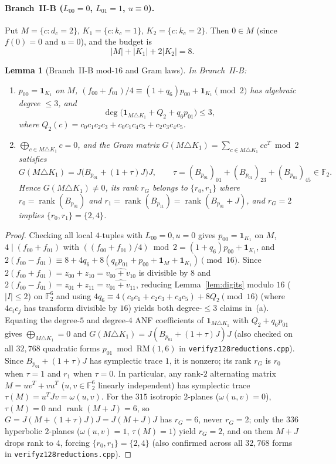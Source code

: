 \documentclass[11pt]{article}
\newtheorem{lemma}[theorem]{Lemma}
\theoremstyle{definition}
\theoremstyle{remark}
\newcommand{\F}{\mathbb{F}}
\newcommand{\rank}{\operatorname{rank}}
\newcommand{\ind}{\mathbf{1}}
\newcommand{\RM}{\mathrm{RM}}
\newcommand{\code}[1]{\texttt{#1}}
\DeclareRobustCommand{\_}{\textunderscore\allowbreak}
\begin{document}
\paragraph{Branch~II-B ($L_{00}=0$, $L_{01}=1$, $u\equiv0$).}
Put $M=\{c:d_c=2\}$, $K_1=\{c:k_c=1\}$, $K_2=\{c:k_c=2\}$. Then $0\in M$ (since $f(0)=0$ and $u=0$), and the budget is
\[
  |M|+|K_1|+2|K_2|=8.
\]

\begin{lemma}[Branch~II-B mod-$16$ and Gram laws]\label{lem:IIB-mod16}
In Branch~II-B:
\begin{enumerate}[label=(\alph*),nosep]
\item $p_{00}=\ind_{K_1}$ on $M$, $(f_{00}+f_{01})/4\equiv(1+q_6)p_{00}+\ind_{K_1}\pmod2$ has algebraic degree $\le3$, and
\[
  \deg\big(\ind_{M\triangle K_1}+Q_2+q_6p_{01}\big)\le3,
\]
where $Q_2(c)=c_0c_1c_2c_3+c_0c_1c_4c_5+c_2c_3c_4c_5$.
\item $\bigoplus_{c\in M\triangle K_1}c=0$, and the Gram matrix $G(M\triangle K_1)=\sum_{c\in M\triangle K_1}cc^T\bmod2$ satisfies
\[
  G(M\triangle K_1)=J\big(B_{p_{01}}+(1+\tau)J\big)J,\qquad
  \tau=(B_{p_{01}})_{01}+(B_{p_{01}})_{23}+(B_{p_{01}})_{45}\in\F_2.
\]
Hence $G(M\triangle K_1)\neq0$, its rank $r_G$ belongs to $\{r_0,r_1\}$ where $r_0=\rank(B_{p_{01}})$ and $r_1=\rank(B_{p_{11}})=\rank(B_{p_{01}}+J)$, and $r_G=2$ implies $\{r_0,r_1\}=\{2,4\}$.
\end{enumerate}
\end{lemma}

\begin{proof}
Checking all local $4$-tuples with $L_{00}=0, u=0$ gives $p_{00}=\ind_{K_1}$ on $M$, $4\mid(f_{00}+f_{01})$ with $((f_{00}+f_{01})/4)\bmod2=(1+q_6)p_{00}+\ind_{K_1}$, and $2(f_{00}-f_{01})\equiv8+4q_6+8(q_6p_{01}+p_{00}+\ind_M+\ind_{K_1})\pmod{16}$. Since $2(f_{00}+f_{01})=z_{00}+z_{10}=\widehat{v_{00}+v_{10}}$ is divisible by $8$ and $2(f_{00}-f_{01})=z_{01}+z_{11}=\widehat{v_{01}+v_{11}}$, reducing Lemma~\ref{lem:digits} modulo $16$ ($|I|\le2$) on $\F_2^6$ and using $4q_6\equiv4(c_0c_1+c_2c_3+c_4c_5)+8Q_2\pmod{16}$ (where $4c_ic_j$ has transform divisible by $16$) yields both degree-$\le3$ claims in~(a). Equating the degree-$5$ and degree-$4$ ANF coefficients of $\ind_{M\triangle K_1}$ with $Q_2+q_6p_{01}$ gives $\bigoplus_{M\triangle K_1}=0$ and $G(M\triangle K_1)=J(B_{p_{01}}+(1+\tau)J)J$ (also checked on all $32{,}768$ quadratic forms $p_{01}\bmod\RM(1,6)$ in \code{verify\_z128\_reductions.cpp}). Since $B_{p_{01}}+(1+\tau)J$ has symplectic trace $1$, it is nonzero; its rank $r_G$ is $r_0$ when $\tau=1$ and $r_1$ when $\tau=0$. In particular, any rank-$2$ alternating matrix $M=uv^T+vu^T$ ($u,v\in\F_2^6$ linearly independent) has symplectic trace $\tau(M)=u^TJv=\omega(u,v)$. For the $315$ isotropic $2$-planes ($\omega(u,v)=0$), $\tau(M)=0$ and $\rank(M+J)=6$, so $G=J(M+(1+\tau)J)J=J(M+J)J$ has $r_G=6$, never $r_G=2$; only the $336$ hyperbolic $2$-planes ($\omega(u,v)=1$, $\tau(M)=1$) yield $r_G=2$, and on them $M+J$ drops rank to $4$, forcing $\{r_0,r_1\}=\{2,4\}$ (also confirmed across all $32{,}768$ forms in \code{verify\_z128\_reductions.cpp}).
\end{proof}
\end{document}
